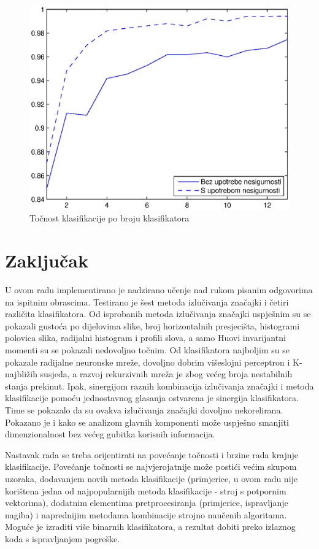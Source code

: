 \documentclass[a4paper,twocolumn,dvipdfm]{article}
\begin{document}
\begin{figure}
\centering
\includegraphics[scale=0.5]{accByClassifCount.eps}
\caption{Točnost klasifikacije po broju klasifikatora}
\label{figure:rezPoBrojuKlas}
\end{figure}


\section{Zaključak}
U ovom radu implementirano je nadzirano učenje nad rukom pisanim odgovorima na
ispitnim obrascima. Testirano je šest metoda izlučivanja značajki i četiri
različita klasifikatora. Od isprobanih metoda izlučivanja značajki uspješnim
su se pokazali gustoća po dijelovima slike, broj horizontalnih presjecišta,
histogrami polovica slika, radijalni histogram i profili slova, a samo Huovi
invarijantni momenti su se pokazali nedovoljno točnim. Od klasifikatora
najboljim su se pokazale radijalne neuronske mreže, dovoljno dobrim višeslojni
perceptron i K-najbližih susjeda, a razvoj rekurzivnih mreža je zbog većeg broja
nestabilnih stanja prekinut. Ipak, sinergijom raznih kombinacija izlučivanja
značajki i metoda klasifikacije pomoću jednostavnog glasanja ostvarena je
sinergija klasifikatora. Time se pokazalo da su ovakva izlučivanja značajki
dovoljno nekorelirana. Pokazano je i kako se analizom glavnih komponenti može
uspješno smanjiti dimenzionalnost bez većeg gubitka korisnih informacija.

Nastavak rada se treba orijentirati na povećanje točnosti i brzine rada krajnje
klasifikacije. Povećanje točnosti se najvjerojatnije može postići većim skupom
uzoraka, dodavanjem novih metoda klasifikacije (primjerice, u ovom radu nije
korištena jedna od najpopularnijih metoda klasifikacije - stroj s potpornim
vektorima), dodatnim elementima pretprocesiranja (primjerice, ispravljanje
nagiba) i naprednijim metodama kombinacije strojno naučenih algoritama. Moguće
je izraditi više binarnih klasifikatora, a rezultat dobiti preko izlaznog koda s
ispravljanjem pogreške.
\end{document}
